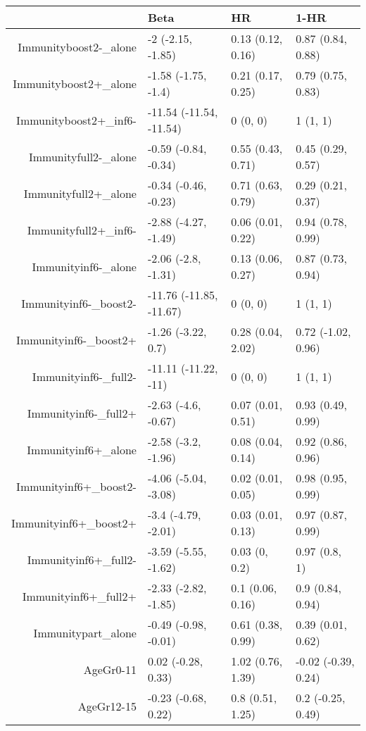 \begin{table}[ht]
\centering
\begin{tabular}{rlll}
  \hline
 & Beta & HR & 1-HR \\ 
  \hline
Immunityboost2-\_alone & -2 (-2.15, -1.85) & 0.13 (0.12, 0.16) & 0.87 (0.84, 0.88) \\ 
  Immunityboost2+\_alone & -1.58 (-1.75, -1.4) & 0.21 (0.17, 0.25) & 0.79 (0.75, 0.83) \\ 
  Immunityboost2+\_inf6- & -11.54 (-11.54, -11.54) & 0 (0, 0) & 1 (1, 1) \\ 
  Immunityfull2-\_alone & -0.59 (-0.84, -0.34) & 0.55 (0.43, 0.71) & 0.45 (0.29, 0.57) \\ 
  Immunityfull2+\_alone & -0.34 (-0.46, -0.23) & 0.71 (0.63, 0.79) & 0.29 (0.21, 0.37) \\ 
  Immunityfull2+\_inf6- & -2.88 (-4.27, -1.49) & 0.06 (0.01, 0.22) & 0.94 (0.78, 0.99) \\ 
  Immunityinf6-\_alone & -2.06 (-2.8, -1.31) & 0.13 (0.06, 0.27) & 0.87 (0.73, 0.94) \\ 
  Immunityinf6-\_boost2- & -11.76 (-11.85, -11.67) & 0 (0, 0) & 1 (1, 1) \\ 
  Immunityinf6-\_boost2+ & -1.26 (-3.22, 0.7) & 0.28 (0.04, 2.02) & 0.72 (-1.02, 0.96) \\ 
  Immunityinf6-\_full2- & -11.11 (-11.22, -11) & 0 (0, 0) & 1 (1, 1) \\ 
  Immunityinf6-\_full2+ & -2.63 (-4.6, -0.67) & 0.07 (0.01, 0.51) & 0.93 (0.49, 0.99) \\ 
  Immunityinf6+\_alone & -2.58 (-3.2, -1.96) & 0.08 (0.04, 0.14) & 0.92 (0.86, 0.96) \\ 
  Immunityinf6+\_boost2- & -4.06 (-5.04, -3.08) & 0.02 (0.01, 0.05) & 0.98 (0.95, 0.99) \\ 
  Immunityinf6+\_boost2+ & -3.4 (-4.79, -2.01) & 0.03 (0.01, 0.13) & 0.97 (0.87, 0.99) \\ 
  Immunityinf6+\_full2- & -3.59 (-5.55, -1.62) & 0.03 (0, 0.2) & 0.97 (0.8, 1) \\ 
  Immunityinf6+\_full2+ & -2.33 (-2.82, -1.85) & 0.1 (0.06, 0.16) & 0.9 (0.84, 0.94) \\ 
  Immunitypart\_alone & -0.49 (-0.98, -0.01) & 0.61 (0.38, 0.99) & 0.39 (0.01, 0.62) \\ 
  AgeGr0-11 & 0.02 (-0.28, 0.33) & 1.02 (0.76, 1.39) & -0.02 (-0.39, 0.24) \\ 
  AgeGr12-15 & -0.23 (-0.68, 0.22) & 0.8 (0.51, 1.25) & 0.2 (-0.25, 0.49) \\ 

\end{tabular}
\end{table}
